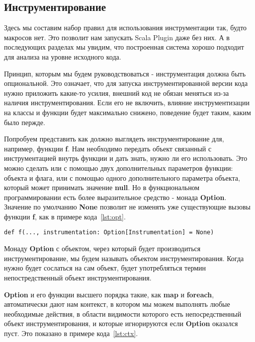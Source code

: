 
\subsection{Инструментирование}
\label{sec:instrumentation}

Здесь мы составим набор правил для использования инструментации так,
будто макросов нет.
Это позволит нам запускать Scala Plugin даже без них.
А в последующих разделах мы увидим, что построенная система хорошо подходит
для анализа на уровне исходного кода.

Принцип, которым мы будем руководствоваться - инструментация должна быть опциональной.
Это означает, что для запуска инструментированной версии кода нужно приложить
какие-то усилия, внешний код не обязан меняться из-за наличия инструментирования.
Если его не включить, влияние инструментизации на классы и функции будет
максимально снижено, поведение будет таким, каким было пержде.

Попробуем представить как должно выглядеть инструментирование для, например,
функции \textbf{f}.
Нам необходимо передать объект связанный с инструментацией внутрь функции и
дать знать, нужно ли его использовать.
Это можно сделать или с помощью двух дополнительных параметров функции:
объекта и флага, или с помощью одного дополнительного параметра объекта,
который может принимать значение \textbf{null}.
Но в функциональном программировании есть более выразительное средство -
монада \textbf{Option}.
Значение по умолчанию \textbf{None} позволит не изменять уже существующие
вызовы функции \textbf{f}, как в примере кода~\ref{lst:opt}.

\begin{lstlisting}[caption={Явная передача объекта инструментирования внутрь функции},label=lst:opt]
def f(..., instrumentation: Option[Instrumentation] = None)
\end{lstlisting}

Монаду \textbf{Option} с объектом, через который будет производиться
инструментирование, мы будем называть объектом инструментирования.
Когда нужно будет сослаться на сам объект, будет употребляться термин
непостредственный объект инструментирования.

\textbf{Option} и его функции высшего порядка такие, как \textbf{map} и
\textbf{foreach}, автоматически дают нам контекст, в котором мы можем выполнять
любые необходимые действия,
в области видимости которого есть непосредственный объект инструментирования,
и которые игнорируются если \textbf{Option} оказался пуст.
Это показано в примере кода~\ref{lst:ctx}.

